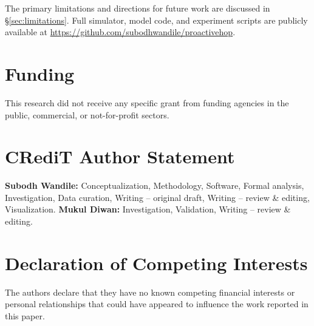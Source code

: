 \documentclass[review,1p]{elsarticle}
\theoremstyle{definition}
\begin{document}
The primary limitations and directions for future work are discussed
in \S\ref{sec:limitations}.  Full simulator, model code, and
experiment scripts are publicly available at
\url{https://github.com/subodhwandile/proactivehop}.

\section*{Funding}
This research did not receive any specific grant from funding agencies in the
public, commercial, or not-for-profit sectors.

\section*{CRediT Author Statement}
\textbf{Subodh Wandile:} Conceptualization, Methodology, Software, Formal analysis,
Investigation, Data curation, Writing -- original draft, Writing -- review \& editing,
Visualization.
\textbf{Mukul Diwan:} Investigation, Validation, Writing -- review \& editing.

\section*{Declaration of Competing Interests}
The authors declare that they have no known competing financial interests or personal
relationships that could have appeared to influence the work reported in this paper.
\end{document}
